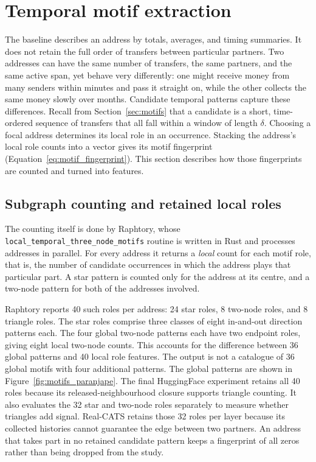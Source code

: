 \section{Temporal motif extraction}
\label{sec:motif_extraction}

The baseline describes an address by totals, averages, and timing summaries.
It does not retain the full order of transfers between particular partners.
Two addresses can have the same number of
transfers, the same partners, and the same active span, yet behave very
differently: one might receive money from many senders within minutes and pass
it straight on, while the other collects the same money slowly over months.
Candidate temporal patterns capture these differences. Recall from
Section~\ref{sec:motifs} that a candidate is a short, time-ordered sequence of
transfers that all fall within a window of length $\delta$. Choosing a focal
address determines its local role in an occurrence. Stacking the address's
local role counts into a vector gives its motif fingerprint
(Equation~\ref{eq:motif_fingerprint}). This section describes how those
fingerprints are counted and turned into features.

\subsection{Subgraph counting and retained local roles}
\label{sec:motifcountingandretainedroles}

The counting itself is done by Raphtory, whose
\texttt{local\_temporal\_three\_node\_motifs} routine is written in Rust and
processes addresses in parallel. For every address it returns a \emph{local}
count for each motif role, that is, the number of candidate occurrences in
which the address plays that particular part. A star pattern is counted only for
the address at its centre, and a two-node pattern for both of the addresses
involved.

Raphtory reports 40 such roles per address: 24 star roles, 8 two-node roles, and
8 triangle roles. The star roles comprise three classes of eight in-and-out
direction patterns each. The four global two-node patterns each have two
endpoint roles, giving eight local two-node counts. This accounts for the
difference between 36 global patterns and 40 local role features. The output
is not a catalogue of 36 global motifs with four additional patterns.
The global patterns are shown in
Figure~\ref{fig:motifs_paranjape}. The final HuggingFace experiment retains all
40 roles because its released-neighbourhood closure supports triangle counting.
It also evaluates the 32 star and two-node roles separately to measure whether
triangles add signal. Real-CATS retains those 32 roles per layer because its
collected histories cannot guarantee the edge between two partners. An address
that takes part in no retained candidate pattern keeps a fingerprint of all zeros rather
than being dropped from the study.

